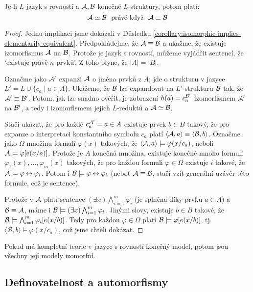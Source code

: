 \begin{proposition}
    Je-li $L$ jazyk s rovností a $\mathcal{A},\mathcal{B}$ konečné $L$-struktury, potom platí:
    $$
    \mathcal{A}\simeq\mathcal{B}\ \text{ právě když }\ \mathcal{A}\equiv\mathcal{B}
    $$
\end{proposition}
\begin{proof}
    Jednu implikaci jsme dokázali v Důsledku \ref{corollary:isomorphic-implies-elementarily-equivalent}. Předpokládejme, že $\mathcal{A}\equiv\mathcal{B}$ a ukažme, že existuje izomorfismus $\mathcal{A}$ na $\mathcal{B}$. Protože je jazyk s rovností, můžeme vyjádřit sentencí, že `existuje právě $n$ prvků'. Z toho plyne, že $|A|=|B|$.

    Označme jako $\mathcal{A}'$ expanzi $\mathcal{A}$ o jména prvků z $A$; jde o strukturu v jazyce $L'=L\cup\{c_a\mid a\in A\}$. Ukážeme, že $\mathcal{B}$ lze expandovat na $L'$-strukturu $\mathcal{B}$ tak, že $\mathcal{A}'\equiv \mathcal{B}'$. Potom, jak lze snadno ověřit, je zobrazení $h(a)= c_a^{\mathcal{B}'}$ izomorfismem $\mathcal{A}'$ na $\mathcal{B}'$, a tedy i izomorfismem jejich $L$-reduktů a $\mathcal{A}\simeq\mathcal{B}$.

    Stačí ukázat, že pro každé $c_a^{\mathcal{A}'}=a\in A$ existuje prvek $b\in B$ takový, že pro expanze o interpretaci konstantního symbolu $c_a$ platí $\langle  \mathcal{A},a\rangle\equiv\langle\mathcal{B},b\rangle$. Označme jako $\Omega$ množinu formulí $\varphi(x)$ takových, že $\langle \mathcal{A},a\rangle \models \varphi(x/c_a)$, neboli $\mathcal{A}\models \varphi[e(x/a)]$. Protože je $A$ konečná množina, existuje konečně mnoho formulí $\varphi_1(x),\dots,\varphi_m(x)$ takových, že pro každou formuli $\varphi \in \Omega$ existuje $i$ takové, že $\mathcal{A}\models \varphi\mathbin{\leftrightarrow}\varphi_i$. Potom i $\mathcal{B}\models\varphi\mathbin{\leftrightarrow}\varphi_i$ (neboť $\mathcal{A}\equiv\mathcal{B}$, stačí vzít generální uzávěr této formule, což je sentence).
    
    Protože v $\mathcal{A}$ platí sentence $(\exists x)\bigwedge_{i=1}^m\varphi_i$ (je splněna díky prvku $a\in A$) a $\mathcal{B}\equiv\mathcal{A}$, máme i $\mathcal{B}\models (\exists x)\bigwedge_{i=1}^m\varphi_i$. Jinými slovy, existuje $b\in B$ takové, že $\mathcal{B}\models\bigwedge_{i=1}^m\varphi_i[e(x/b)]$. Tedy pro každou $\varphi\in \Omega$ platí $\mathcal{B}\models \varphi[e(x/b)]$, tj. $\langle\mathcal{B},b\rangle\models \varphi(x/c_a)$, což jsme chtěli dokázat.
\end{proof}

\begin{corollary}
    Pokud má kompletní teorie v jazyce s rovností konečný model, potom jsou všechny její modely izomorfní.
\end{corollary}


\subsection{Definovatelnost a automorfismy}

